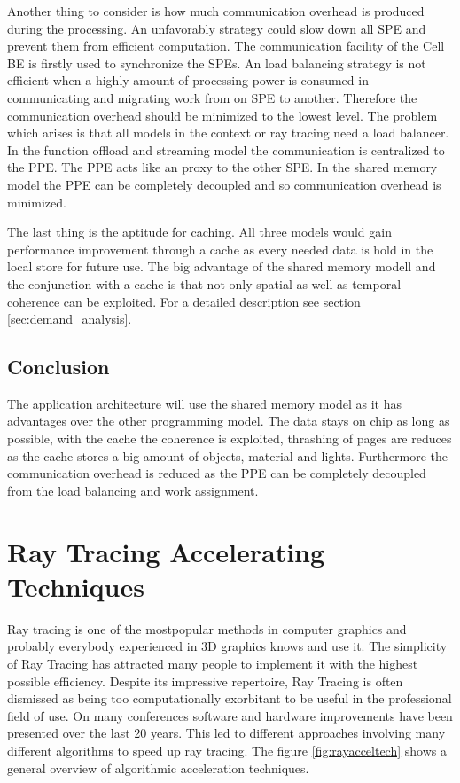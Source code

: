 \documentclass[DIV10, abstracton, openright, footsepline, headsepline, twoside, 9pt,
bigheadings]{scrreprt}
\begin{document}
Another thing to consider is how much communication overhead is produced during the
 processing. An unfavorably strategy could slow down all SPE and prevent them from
efficient computation. The communication facility of the Cell BE is firstly used
to synchronize the SPEs. An load balancing strategy is not efficient when a highly
amount of processing power is consumed in communicating and migrating work from on
SPE to another. Therefore the communication overhead should be minimized to the lowest
level. The problem which arises is that all models in the context or ray tracing need
a load balancer. In the function offload and streaming model the communication is
centralized to the PPE. The PPE acts like an proxy to the other SPE. In the shared memory
model the PPE can be completely decoupled and so communication overhead is minimized.

The last thing is the aptitude for caching. All three models would gain performance
improvement through a cache as every needed data is hold in the local store for future use.
The big advantage of the shared memory modell and the conjunction with a cache is
that not only spatial as well as temporal coherence can be exploited. For a detailed
description see section \ref{sec:demand_analysis}.

\subsection{Conclusion}
The application architecture will use the shared memory model as it has advantages
over the other programming model. The data stays on chip as long as possible, with
the cache the coherence  is exploited, thrashing of pages are reduces as the cache
stores a big amount of objects, material and lights. Furthermore the communication
overhead is reduced as the PPE can be completely decoupled from the load balancing
and work assignment.

\newpage
\section{Ray Tracing Accelerating Techniques}
\label{sec:accel}
Ray tracing is one of the mostpopular methods in computer graphics and probably
everybody experienced in 3D graphics knows and use it. The simplicity of Ray
Tracing has attracted many people to implement it with the highest possible
efficiency. Despite its impressive repertoire, Ray Tracing is often
dismissed
as being too computationally exorbitant to be useful in the professional field
of use. On many conferences software and hardware improvements have been
presented over the last 20 years. This led to different approaches involving
many different algorithms to speed up ray tracing. The figure
\ref{fig:rayacceltech} shows a general overview of algorithmic acceleration
techniques.
\end{document}
